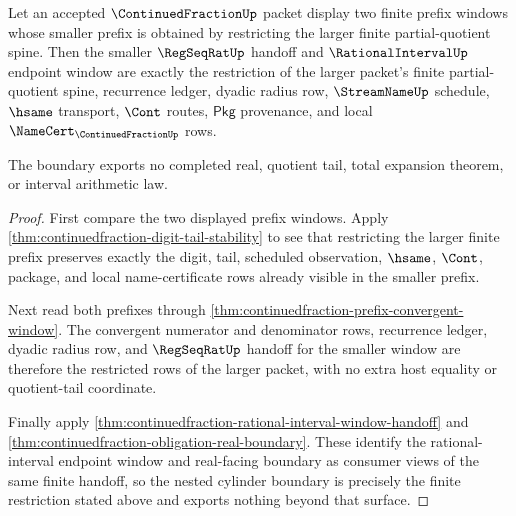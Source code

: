 \begin{theorem}
\label{thm:continuedfraction-nested-cylinder-boundary}
Let an accepted $\ContinuedFractionUp$ packet display two finite prefix windows
whose smaller prefix is obtained by restricting the larger finite
partial-quotient spine. Then the smaller $\RegSeqRatUp$ handoff and
$\RationalIntervalUp$ endpoint window are exactly the restriction of the larger
packet's finite partial-quotient spine, recurrence ledger, dyadic radius row,
$\StreamNameUp$ schedule, $\hsame$ transport, $\Cont$ routes, $\mathsf{Pkg}$
provenance, and local $\NameCert_{\ContinuedFractionUp}$ rows.

The boundary exports no completed real, quotient tail, total expansion theorem,
or interval arithmetic law.
\end{theorem}
\begin{proof}
First compare the two displayed prefix windows. Apply
\autoref{thm:continuedfraction-digit-tail-stability} to see that restricting
the larger finite prefix preserves exactly the digit, tail, scheduled
observation, $\hsame$, $\Cont$, package, and local name-certificate rows already
visible in the smaller prefix.

Next read both prefixes through
\autoref{thm:continuedfraction-prefix-convergent-window}. The convergent
numerator and denominator rows, recurrence ledger, dyadic radius row, and
$\RegSeqRatUp$ handoff for the smaller window are therefore the restricted rows
of the larger packet, with no extra host equality or quotient-tail coordinate.

Finally apply
\autoref{thm:continuedfraction-rational-interval-window-handoff} and
\autoref{thm:continuedfraction-obligation-real-boundary}. These identify the
rational-interval endpoint window and real-facing boundary as consumer views of
the same finite handoff, so the nested cylinder boundary is precisely the
finite restriction stated above and exports nothing beyond that surface.
\end{proof}

